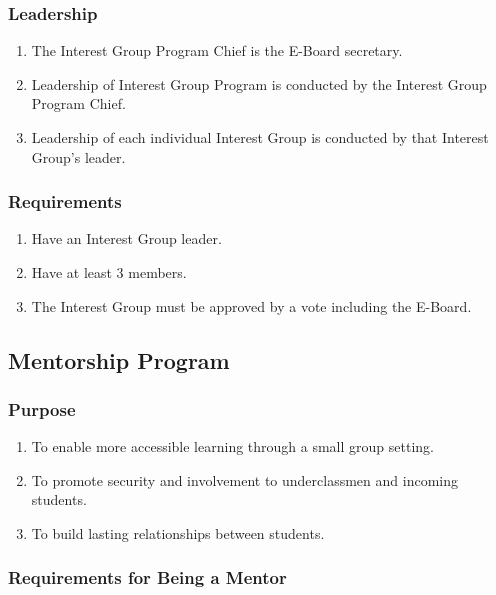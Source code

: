 \subsubsection{Leadership}

\begin{enumerate}
  \item The Interest Group Program Chief is the E-Board secretary.
  \item Leadership of Interest Group Program is conducted by the Interest Group
    Program Chief.
  \item Leadership of each individual Interest Group is conducted by that
    Interest Group's leader.
\end{enumerate}

\subsubsection{Requirements}

\begin{enumerate}
  \item Have an Interest Group leader.
  \item Have at least 3 members.
  \item The Interest Group must be approved by a vote including the E-Board.
\end{enumerate}

\subsection{Mentorship Program}

\subsubsection{Purpose}

\begin{enumerate}
  \item To enable more accessible learning through a small group setting.
  \item To promote security and involvement to underclassmen and incoming
    students.
  \item To build lasting relationships between students.
\end{enumerate}

\subsubsection{Requirements for Being a Mentor}

